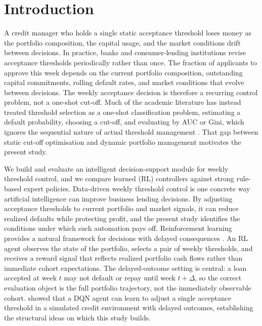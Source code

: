 \documentclass[preprint,review,authoryear,12pt]{elsarticle}
\begin{document}
\section{Introduction}

A credit manager who holds a single static acceptance threshold loses money as the
portfolio composition, the capital usage, and the market conditions drift between
decisions. In practice, banks and consumer-lending institutions revise acceptance
thresholds periodically rather than once. The fraction of applicants to approve this
week depends on the current portfolio composition, outstanding capital commitments,
rolling default rates, and market conditions that evolve between decisions. The weekly
acceptance decision is therefore a recurring control problem, not a one-shot cut-off.
Much of the academic literature has instead treated threshold selection as a one-shot
classification problem, estimating a default probability, choosing a cut-off, and
evaluating by AUC or Gini, which ignores the sequential nature of actual threshold
management \citep{thomas2017, lessmann2015}. That gap between static cut-off
optimisation and dynamic portfolio management motivates the present study.

We build and evaluate an intelligent decision-support module for weekly threshold
control, and we compare learned (RL) controllers against strong rule-based expert
policies. Data-driven weekly threshold control is one concrete way artificial
intelligence can improve business lending decisions. By adjusting acceptance
thresholds to current portfolio and market signals, it can reduce realized defaults
while protecting profit, and the present study identifies the conditions under which
such automation pays off. Reinforcement learning provides a natural framework for
decisions with delayed consequences \citep{arulkumaran2017}. An RL agent observes the
state of the portfolio, selects a pair of weekly thresholds, and receives a reward
signal that reflects realized portfolio cash flows rather than immediate cohort
expectations. The delayed-outcome setting is central: a loan accepted at week $t$ may
not default or repay until week $t + \Delta$, so the correct evaluation object is the
full portfolio trajectory, not the immediately observable cohort.
\citet{herasymovych2019} showed that a DQN agent can learn to adjust a single
acceptance threshold in a simulated credit environment with delayed outcomes,
establishing the structural ideas on which this study builds.
\end{document}
